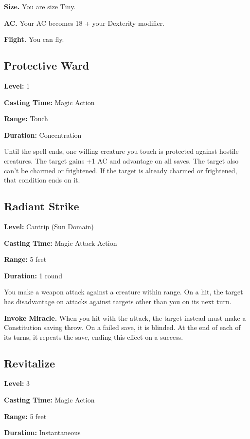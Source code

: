 \documentclass[12pt,letterpaper,twocolumn,openany,nodeprecatedcode,bg=none]{dndbook}
\begin{document}
\textbf{Size.} You are size Tiny.

\textbf{AC.} Your AC becomes 18 + your Dexterity modifier.

\textbf{Flight.} You can fly.

\subsection{Protective Ward}\label{protective-ward}

\textbf{Level:} 1

\textbf{Casting Time:} Magic Action

\textbf{Range:} Touch

\textbf{Duration:} Concentration

Until the spell ends, one willing creature you touch is protected
against hostile creatures. The target gains +1 AC and advantage on all
saves. The target also can't be charmed or frightened. If the target is
already charmed or frightened, that condition ends on it.

\clearpage

\subsection{Radiant Strike}\label{radiant-strike}

\textbf{Level:} Cantrip (Sun Domain)

\textbf{Casting Time:} Magic Attack Action

\textbf{Range:} 5 feet

\textbf{Duration:} 1 round

You make a weapon attack against a creature within range. On a hit, the
target has disadvantage on attacks against targets other than you on its
next turn.

\textbf{Invoke Miracle.} When you hit with the attack, the target
instead must make a Constitution saving throw. On a failed save, it is
blinded. At the end of each of its turns, it repeats the save, ending
this effect on a success.

\subsection{Revitalize}\label{revitalize}

\textbf{Level:} 3

\textbf{Casting Time:} Magic Action

\textbf{Range:} 5 feet

\textbf{Duration:} Instantaneous
\end{document}
